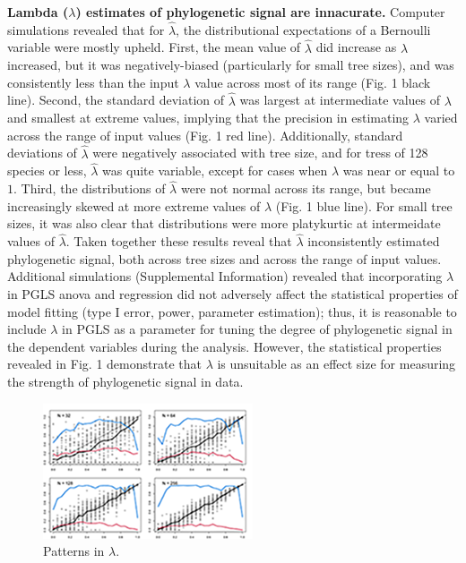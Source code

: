 \documentclass[9pt,twocolumn,twoside,lineno]{pnas-new}
\begin{document}
\textbf{Lambda (\(\lambda\)) estimates of phylogenetic signal are
innacurate.} Computer simulations revealed that for \(\hat{\lambda}\),
the distributional expectations of a Bernoulli variable were mostly
upheld. First, the mean value of \(\hat{\lambda}\) did increase as
\(\lambda\) increased, but it was negatively-biased (particularly for
small tree sizes), and was consistently less than the input \(\lambda\)
value across most of its range (Fig. 1 black line). Second, the standard
deviation of \(\hat{\lambda}\) was largest at intermediate values of
\(\lambda\) and smallest at extreme values, implying that the precision
in estimating \(\lambda\) varied across the range of input values (Fig.
1 red line). Additionally, standard deviations of \(\hat{\lambda}\) were
negatively associated with tree size, and for tress of 128 species or
less, \(\hat{\lambda}\) was quite variable, except for cases when
\(\lambda\) was near or equal to \(1\). Third, the distributions of
\(\hat{\lambda}\) were not normal across its range, but became
increasingly skewed at more extreme values of \(\lambda\) (Fig. 1 blue
line). For small tree sizes, it was also clear that distributions were
more platykurtic at intermeidate values of \(\hat{\lambda}\). Taken
together these results reveal that \(\hat\lambda\) inconsistently
estimated phylogenetic signal, both across tree sizes and across the
range of input values. Additional simulations (Supplemental Information)
revealed that incorporating \(\lambda\) in PGLS anova and regression did
not adversely affect the statistical properties of model fitting (type I
error, power, parameter estimation); thus, it is reasonable to include
\(\lambda\) in PGLS as a parameter for tuning the degree of phylogenetic
signal in the dependent variables during the analysis. However, the
statistical properties revealed in Fig. 1 demonstrate that \(\lambda\)
is unsuitable as an effect size for measuring the strength of
phylogenetic signal in data.

\begin{figure}
\centering
\includegraphics{new.fig.1.temp.png}
\caption{Patterns in \(\lambda\).{}}
\end{figure}
\end{document}
